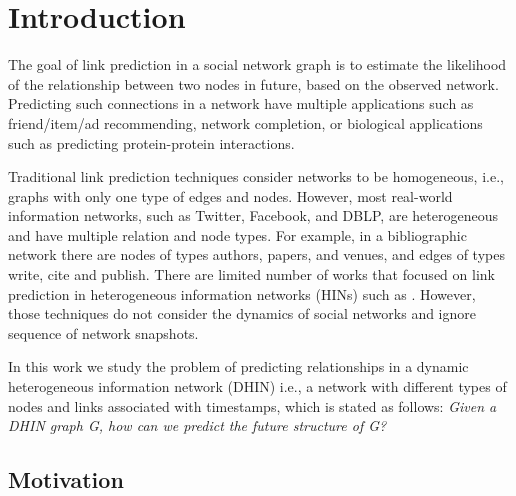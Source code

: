\section{Introduction}
\label{Sec:Introduction}


The goal of link prediction in a social network graph \cite{liben2007link} is to estimate the likelihood of the relationship between two nodes in future, based on the observed network. Predicting such connections in a network have multiple applications such as friend/item/ad recommending, network completion, or biological applications such as predicting protein-protein interactions. 


Traditional link prediction techniques \cite{liben2007link} consider networks to be homogeneous, i.e., graphs with only one type of edges and nodes. However, most real-world information networks, such as Twitter, Facebook, and DBLP, are heterogeneous and have multiple relation and node types. For example, in a bibliographic network there are nodes of types authors, papers, and venues, and edges of types write, cite and publish. There are limited number of works that focused on 
link prediction in heterogeneous information networks (HINs) such as \cite{sun2011pathsim}. However, those techniques do not consider the dynamics of social networks and ignore sequence of network snapshots.  \cite{Zhu2016} \cite{sun2011pathsim} \cite{Sun:2012:HRP:2124295.2124373}  \cite{huang2016meta} \cite{wang2016relsim} \cite{sun2013pathselclus} \cite{sun2011ASONAM} \cite{Yang2012} \cite{liben2007link}

In this work we study the problem of predicting relationships in a dynamic heterogeneous information network (DHIN) i.e., a network with different types of nodes and links associated with timestamps, which is stated as follows: \textit{Given a DHIN graph G, how can we predict the future structure of G?}


\subsection{Motivation}


